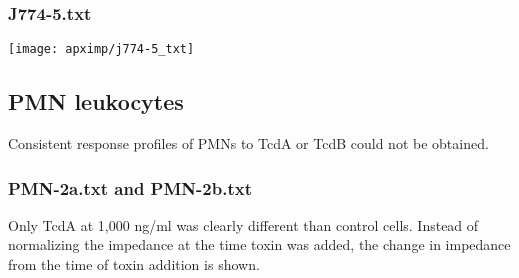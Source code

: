 \subsubsection{J774-5.txt}

\singlespacing \begin{knitrout}
\color{fgcolor}\begin{kframe}
\begin{alltt}
 \hlkwb{=}   \hlstd{=} \hlstd{)}
 \hlkwb{=}  \hlstd{(}\hlopt{-}\hlstd{,} \hlstd{))}
 \hlkwb{=}   \hlstd{=} \hlstd{(}\hlopt{-}\hlstd{,} \hlstd{))}
 \hlkwb{=}   \hlstd{=} \hlstd{(}\hlopt{-}\hlstd{,} \hlstd{))}
  \hlstd{=} \hlstd{)}
\end{alltt}
\end{kframe}
\texttt{[image: apximp/j774-5\_txt]} 

\end{knitrout} \doublespacing



\subsection{PMN leukocytes}\label{S:PMNs}

Consistent response profiles of PMNs to TcdA or TcdB could not be obtained.

\subsubsection{PMN-2a.txt and PMN-2b.txt}

Only TcdA at 1,000 ng/ml was clearly different than control cells. Instead of
normalizing the impedance at the time toxin was added, the change in impedance
from the time of toxin addition is shown.


